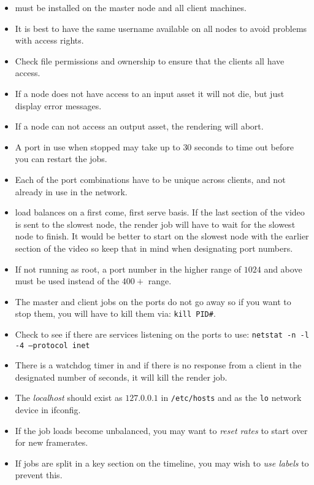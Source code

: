 \begin{itemize}
    \item \CGG{} must be installed on the master node and all client machines.
    \item It is best to have the same username available on all nodes to avoid problems with access rights.
    \item Check file permissions and ownership to ensure that the clients all have access.
    \item If a node does not have access to an input asset it will not die, but just display error messages.
    \item If a node can not access an output asset, the rendering will abort.
    \item A port in use when stopped may take up to $30$ seconds to time out before you can restart the jobs.
    \item Each of the port combinations have to be unique across clients, and not already in use in the network.
    \item \CGG{} load balances on a first come, first serve basis.  If the last section of the video is sent to the
    slowest node, the render job will have to wait for the slowest node to finish.  It would be better to
    start on the slowest node with the earlier section of the video so keep that in mind when designating
    port numbers.
    \item If not running as root, a port number in the higher range of $1024$ and above must be used instead of
    the $400+$ range.
    \item The master and client jobs on the ports do not go away so if you want to stop them, you will have to
    kill them via: \texttt{kill PID\#}.
    \item Check to see if there are services listening on the ports to use:  \texttt{netstat -n -l -4 --protocol inet}
    \item There is a watchdog timer in \CGG{} and if there is no response from a client in the designated
    number of seconds, it will kill the render job.
    \item The \textit{localhost} should exist as $127.0.0.1$ in \texttt{/etc/hosts} and as the \texttt{lo} network device in ifconfig.
    \item If the job loads become unbalanced, you may want to \textit{reset rates} to start over for new framerates.
    \item If jobs are split in a key section on the timeline, you may wish to \textit{use labels} to prevent this.

\end{itemize}
